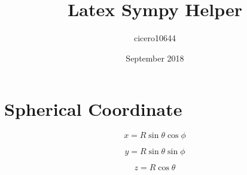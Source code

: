 \documentclass{article}
\title{Latex Sympy Helper}
\author{cicero10644 }
\date{September 2018}
\begin{document}
\section{Spherical Coordinate}

\begin{equation}
    x = R\sin \theta \cos \phi
\end{equation}

\begin{equation}
    y = R\sin \theta \sin \phi
\end{equation}

\begin{equation}
    z = R\cos \theta
\end{equation}
\maketitle
\end{document}
